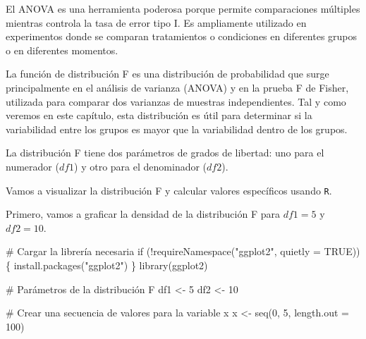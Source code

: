 \documentclass[
  letterpaper,
  DIV=11,
  numbers=noendperiod]{scrreprt}
\newenvironment{Shaded}{\begin{snugshade}}{\end{snugshade}}
\newcommand{\AttributeTok}[1]{\textcolor[rgb]{0.40,0.45,0.13}{#1}}
\newcommand{\CommentTok}[1]{\textcolor[rgb]{0.37,0.37,0.37}{#1}}
\newcommand{\ConstantTok}[1]{\textcolor[rgb]{0.56,0.35,0.01}{#1}}
\newcommand{\ControlFlowTok}[1]{\textcolor[rgb]{0.00,0.23,0.31}{#1}}
\newcommand{\DecValTok}[1]{\textcolor[rgb]{0.68,0.00,0.00}{#1}}
\newcommand{\FunctionTok}[1]{\textcolor[rgb]{0.28,0.35,0.67}{#1}}
\newcommand{\NormalTok}[1]{\textcolor[rgb]{0.00,0.23,0.31}{#1}}
\newcommand{\OtherTok}[1]{\textcolor[rgb]{0.00,0.23,0.31}{#1}}
\newcommand{\SpecialCharTok}[1]{\textcolor[rgb]{0.37,0.37,0.37}{#1}}
\newcommand{\StringTok}[1]{\textcolor[rgb]{0.13,0.47,0.30}{#1}}
\begin{document}
El ANOVA es una herramienta poderosa porque permite comparaciones
múltiples mientras controla la tasa de error tipo I. Es ampliamente
utilizado en experimentos donde se comparan tratamientos o condiciones
en diferentes grupos o en diferentes momentos.

\begin{tcolorbox}[enhanced jigsaw, arc=.35mm, breakable, coltitle=black, left=2mm, opacityback=0, bottomtitle=1mm, colbacktitle=quarto-callout-warning-color!10!white, title=\textcolor{quarto-callout-warning-color}{\faExclamationTriangle}\hspace{0.5em}{Distribución F}, titlerule=0mm, colback=white, colframe=quarto-callout-warning-color-frame, bottomrule=.15mm, rightrule=.15mm, opacitybacktitle=0.6, toptitle=1mm, toprule=.15mm, leftrule=.75mm]

La función de distribución F es una distribución de probabilidad que
surge principalmente en el análisis de varianza (ANOVA) y en la prueba F
de Fisher, utilizada para comparar dos varianzas de muestras
independientes. Tal y como veremos en este capítulo, esta distribución
es útil para determinar si la variabilidad entre los grupos es mayor que
la variabilidad dentro de los grupos.

La distribución F tiene dos parámetros de grados de libertad: uno para
el numerador (\(df1\)) y otro para el denominador (\(df2\)).

Vamos a visualizar la distribución F y calcular valores específicos
usando \texttt{R}.

Primero, vamos a graficar la densidad de la distribución F para
\(df1 = 5\) y \(df2 = 10\).

\begin{Shaded}
\begin{Highlighting}[]
\CommentTok{\# Cargar la librería necesaria}
\ControlFlowTok{if}\NormalTok{ (}\SpecialCharTok{!}\FunctionTok{requireNamespace}\NormalTok{(}\StringTok{"ggplot2"}\NormalTok{, }\AttributeTok{quietly =} \ConstantTok{TRUE}\NormalTok{)) \{}
  \FunctionTok{install.packages}\NormalTok{(}\StringTok{"ggplot2"}\NormalTok{)}
\NormalTok{\}}
\FunctionTok{library}\NormalTok{(ggplot2)}

\CommentTok{\# Parámetros de la distribución F}
\NormalTok{df1 }\OtherTok{\textless{}{-}} \DecValTok{5}
\NormalTok{df2 }\OtherTok{\textless{}{-}} \DecValTok{10}

\CommentTok{\# Crear una secuencia de valores para la variable x}
\NormalTok{x }\OtherTok{\textless{}{-}} \FunctionTok{seq}\NormalTok{(}\DecValTok{0}\NormalTok{, }\DecValTok{5}\NormalTok{, }\AttributeTok{length.out =} \DecValTok{100}\NormalTok{)}


\end{Highlighting}
\end{Shaded}
\end{tcolorbox}
\end{document}
